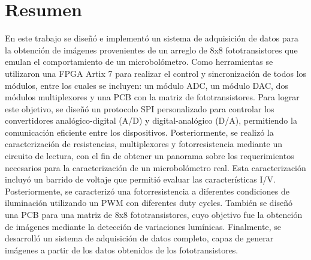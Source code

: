 \chapter{Resumen}

En este trabajo se diseñó e implementó un sistema de adquisición de datos para la obtención de imágenes provenientes de un arreglo de 8x8 fototransistores que emulan el comportamiento de un microbolómetro. Como herramientas se utilizaron una FPGA Artix 7 para realizar el control y sincronización de todos los módulos, entre los cuales se incluyen: un módulo ADC, un módulo DAC, dos módulos multiplexores y una PCB con la matriz de fototransistores. Para lograr este objetivo, se diseñó un protocolo SPI personalizado para controlar los convertidores analógico-digital (A/D) y digital-analógico (D/A), permitiendo la comunicación eficiente entre los dispositivos. Posteriormente, se realizó la caracterización de resistencias, multiplexores y fotorresistencia mediante un circuito de lectura, con el fin de obtener un panorama sobre los requerimientos necesarios para la caracterización de un microbolómetro real. Esta caracterización incluyó un barrido de voltaje que permitió evaluar las características I/V. Posteriormente, se caracterizó una fotorresistencia a diferentes condiciones de iluminación utilizando un PWM con diferentes duty cycles. También se diseñó una PCB para una matriz de 8x8 fototransistores, cuyo objetivo fue la obtención de imágenes mediante la detección de variaciones lumínicas. Finalmente, se desarrolló un sistema de adquisición de datos completo, capaz de generar imágenes a partir de los datos obtenidos de los fototransistores.
    